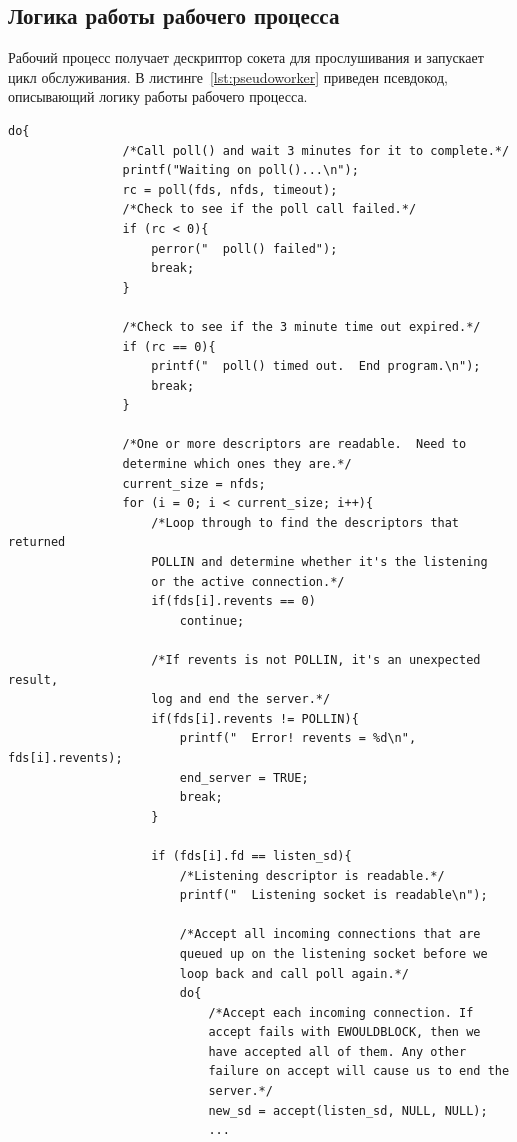 \subsection{Логика работы рабочего процесса}
Рабочий процесс получает дескриптор сокета для прослушивания и запускает цикл обслуживания.
В листинге~\ref{lst:pseudoworker} приведен псевдокод, описывающий логику работы рабочего процесса.

\begin{lstlisting}[caption={Логика работы рабочего процесса},label=lst:pseudoworker]
do{
                /*Call poll() and wait 3 minutes for it to complete.*/
                printf("Waiting on poll()...\n");
                rc = poll(fds, nfds, timeout);
                /*Check to see if the poll call failed.*/
                if (rc < 0){
                    perror("  poll() failed");
                    break;
                }

                /*Check to see if the 3 minute time out expired.*/
                if (rc == 0){
                    printf("  poll() timed out.  End program.\n");
                    break;
                }

                /*One or more descriptors are readable.  Need to
                determine which ones they are.*/
                current_size = nfds;
                for (i = 0; i < current_size; i++){
                    /*Loop through to find the descriptors that returned
                    POLLIN and determine whether it's the listening
                    or the active connection.*/
                    if(fds[i].revents == 0)
                        continue;

                    /*If revents is not POLLIN, it's an unexpected result,
                    log and end the server.*/
                    if(fds[i].revents != POLLIN){
                        printf("  Error! revents = %d\n", fds[i].revents);
                        end_server = TRUE;
                        break;
                    }

                    if (fds[i].fd == listen_sd){
                        /*Listening descriptor is readable.*/
                        printf("  Listening socket is readable\n");

                        /*Accept all incoming connections that are
                        queued up on the listening socket before we
                        loop back and call poll again.*/
                        do{
                            /*Accept each incoming connection. If
                            accept fails with EWOULDBLOCK, then we
                            have accepted all of them. Any other
                            failure on accept will cause us to end the
                            server.*/
                            new_sd = accept(listen_sd, NULL, NULL);
                            ...
                            

\end{lstlisting}
